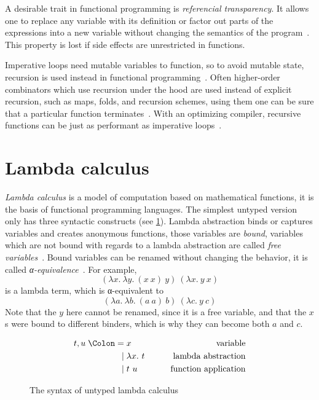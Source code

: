 A desirable trait in functional programming is \emph{referencial transparency}.
It allows one to replace any variable with its definition or factor out parts of
the expressions into a new variable without changing the semantics of the
program~\cite{functional-Hudak, functional-Hughes, functional-Barendregt}. This
property is lost if side effects are unrestricted in functions.

Imperative loops need mutable variables to function, so to avoid mutable state,
recursion is used instead in functional programming~\cite{functional-Hudak}.
Often higher-order combinators which use recursion under the hood are used
instead of explicit recursion, such as maps, folds, and recursion schemes, using
them one can be sure that a particular function terminates~\cite{fold-Hutton,
  bananas-Meijer}. With an optimizing compiler, recursive functions can be just as
performant as imperative loops~\cite{sicp}.

\section{Lambda calculus}\label{sec:lambda}

\emph{Lambda calculus} is a model of computation based on mathematical
functions, it is the basis of functional programming languages. The simplest
untyped version only has three syntactic constructs (see
\cref{fig:lambda-syntax}). Lambda abstraction binds or captures variables and
creates anonymous functions, those variables are \emph{bound}, variables which
are not bound with regards to a lambda abstraction are called \emph{free
  variables}~\cite{functional-Hudak, functional-Barendregt, lambda-Revesz,
  lambda-Hindley}. Bound variables can be renamed without changing the behavior,
it is called \emph{α-equivalence}~\cite{functional-Hudak, lambda-Revesz}. For
example,
\begin{equation}
  (\lambda x.\ \lambda y.\ (x\ x)\ y)\ (\lambda x.\ y\ x)
  \label{eq:lambda-ex}
\end{equation} is a
lambda term, which is α-equivalent to
\begin{equation}
  (\lambda a.\ \lambda b.\ (a\ a)\ b)\ (\lambda c.\ y\ c)
  \label{eq:lambda-ex-rename}
\end{equation}
Note that the \(y\) here cannot be renamed, since it is a free variable, and
that the \(x\)s were bound to different binders, which is why they can become
both \(a\) and \(c\).

\begin{figure}
  \begin{alignat*}{2}
    t, u \Coleqq{} & x             & \qquad\text{variable}             \\
    \mid{}         & \lambda x.\ t & \qquad\text{lambda abstraction}   \\
    \mid{}         & t\ u          & \qquad\text{function application}
  \end{alignat*}
  \caption{The syntax of untyped lambda calculus}\label{fig:lambda-syntax}
\end{figure}

